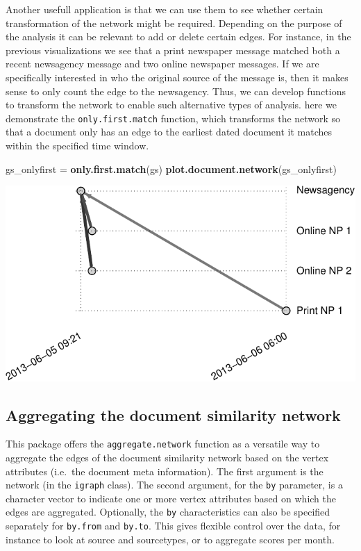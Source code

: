 \documentclass[]{article}
\newenvironment{Shaded}{\begin{snugshade}}{\end{snugshade}}
\newcommand{\KeywordTok}[1]{\textcolor[rgb]{0.13,0.29,0.53}{\textbf{{#1}}}}
\newcommand{\StringTok}[1]{\textcolor[rgb]{0.31,0.60,0.02}{{#1}}}
\newcommand{\NormalTok}[1]{{#1}}
\begin{document}
Another usefull application is that we can use them to see whether
certain transformation of the network might be required. Depending on
the purpose of the analysis it can be relevant to add or delete certain
edges. For instance, in the previous visualizations we see that a print
newspaper message matched both a recent newsagency message and two
online newspaper messages. If we are specifically interested in who the
original source of the message is, then it makes sense to only count the
edge to the newsagency. Thus, we can develop functions to transform the
network to enable such alternative types of analysis. here we
demonstrate the \texttt{only.first.match} function, which transforms the
network so that a document only has an edge to the earliest dated
document it matches within the specified time window.

\begin{Shaded}
\begin{Highlighting}[]
\NormalTok{gs_onlyfirst =}\StringTok{ }\KeywordTok{only.first.match}\NormalTok{(gs)}
\KeywordTok{plot.document.network}\NormalTok{(gs_onlyfirst)}
\end{Highlighting}
\end{Shaded}

\includegraphics{vignette_files/figure-latex/unnamed-chunk-17-1.pdf}

\subsection{Aggregating the document similarity
network}\label{aggregating-the-document-similarity-network}

This package offers the \texttt{aggregate.network} function as a
versatile way to aggregate the edges of the document similarity network
based on the vertex attributes (i.e.~the document meta information). The
first argument is the network (in the \texttt{igraph} class). The second
argument, for the \texttt{by} parameter, is a character vector to
indicate one or more vertex attributes based on which the edges are
aggregated. Optionally, the \texttt{by} characteristics can also be
specified separately for \texttt{by.from} and \texttt{by.to}. This gives
flexible control over the data, for instance to look at source and
sourcetypes, or to aggregate scores per month.
\end{document}
